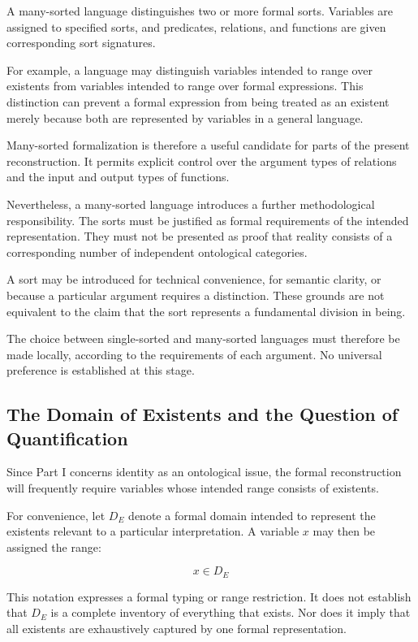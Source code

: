A many-sorted language distinguishes
two or more formal sorts. Variables
are assigned to specified sorts,
and predicates, relations, and
functions are given corresponding
sort signatures.

For example, a language may
distinguish variables intended
to range over existents from
variables intended to range
over formal expressions. This
distinction can prevent a formal
expression from being treated
as an existent merely because
both are represented by variables
in a general language.

Many-sorted formalization is
therefore a useful candidate
for parts of the present
reconstruction. It permits
explicit control over the
argument types of relations
and the input and output types
of functions.

Nevertheless, a many-sorted
language introduces a further
methodological responsibility.
The sorts must be justified
as formal requirements of
the intended representation.
They must not be presented
as proof that reality consists
of a corresponding number
of independent ontological
categories.

A sort may be introduced
for technical convenience,
for semantic clarity, or
because a particular argument
requires a distinction.
These grounds are not
equivalent to the claim
that the sort represents
a fundamental division
in being.

The choice between single-sorted
and many-sorted languages
must therefore be made
locally, according to the
requirements of each argument.
No universal preference
is established at this stage.

\subsection{The Domain of Existents and the Question of Quantification}

Since Part I concerns identity
as an ontological issue, the
formal reconstruction will
frequently require variables
whose intended range consists
of existents.

For convenience, let \(D_E\)
denote a formal domain intended
to represent the existents
relevant to a particular
interpretation. A variable
\(x\) may then be assigned
the range:

\[
x \in D_E
\]

This notation expresses
a formal typing or range
restriction. It does not
establish that \(D_E\)
is a complete inventory
of everything that exists.
Nor does it imply that
all existents are exhaustively
captured by one formal
representation.

